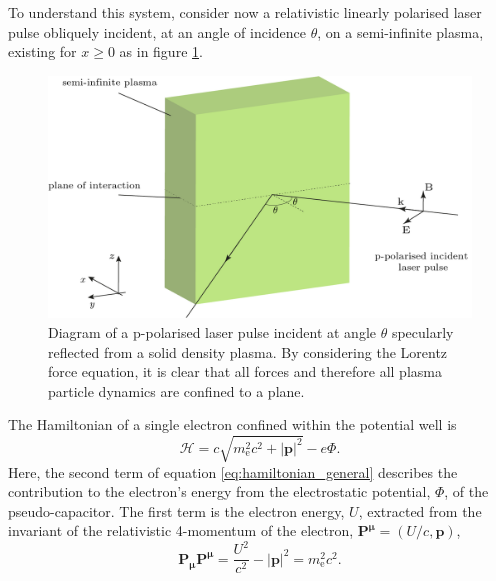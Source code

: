 To understand this system, consider now a relativistic linearly polarised laser pulse obliquely incident, at an angle of incidence $\theta$, on a semi-infinite plasma, existing for $x\ge0$ as in figure \ref{fig:zvpforcesppol}.

\begin{figure}
	\centering
	\includegraphics[width=0.7\linewidth]{figures/zvp/zvp_forces_ppol}
	\caption[Diagram of a p-polarised laser pulse incident at angle $\theta$ specularly reflected from a solid density plasma.]{Diagram of a p-polarised laser pulse incident at angle $\theta$ specularly reflected from a solid density plasma. By considering the Lorentz force equation, it is clear that all forces and therefore all plasma particle dynamics are confined to a plane.}
	\label{fig:zvpforcesppol}
\end{figure}
The Hamiltonian of a single electron confined within the potential well \cite{goldsteinClassicalMechanics2013} is
\begin{equation}\label{eq:hamiltonian_general}
	\mathcal{H} = c\sqrt{m^2_\mathrm{e}c^2 + |\mathbf{p}|^2} - e\Phi.
\end{equation}
Here, the second term of equation \ref{eq:hamiltonian_general} describes the contribution to the electron's energy from the electrostatic potential, $\Phi$, of the pseudo-capacitor. The first term is the electron energy, $U$, extracted from the invariant of the relativistic 4-momentum of the electron, $\mathbf{P^\mu} = (U/c, \mathbf{p})$,
\begin{equation}\label{eq:zvp-energy_invariant}
	\mathbf{P_\mu  P^\mu} = \frac{U^2}{c^2} - |\mathbf{p}|^2 = m^2_\mathrm{e}c^2.
\end{equation}

